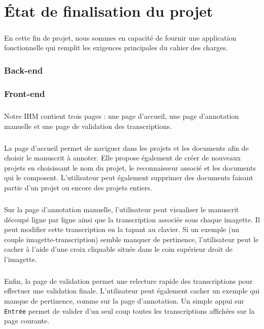 \chapter{État de finalisation du projet}

\paragraph{}
En cette fin de projet, nous sommes en capacité de fournir une application fonctionnelle qui remplit les exigences principales du cahier des charges.

\subsection{Back-end}

\subsection{Front-end}
\paragraph{}
Notre IHM contient trois pages : une page d'accueil, une page d'annotation manuelle et une page de validation des transcriptions.
\paragraph{}
La page d'accueil permet de naviguer dans les projets et les documents afin de choisir le manuscrit à annoter. Elle propose également de créer de nouveaux projets en choisissant le nom du projet, le reconnaisseur associé et les documents qui le composent. L'utilisateur peut également supprimer des documents faisant partie d'un projet ou encore des projets entiers.
\paragraph{}
Sur la page d'annotation manuelle, l'utilisateur peut visualiser le manuscrit découpé ligne par ligne ainsi que la transcription associée sous chaque imagette. Il peut modifier cette transcription en la tapant au clavier. Si un exemple (un couple imagette-transcription) semble manquer de pertinence, l'utilisateur peut le cacher à l'aide d'une croix cliquable située dans le coin supérieur droit de l'imagette.
\paragraph{}
Enfin, la page de validation permet une relecture rapide des transcriptions pour effectuer une validation finale. L'utilisateur peut également cacher un exemple qui manque de pertinence, comme sur la page d'annotation. Un simple appui sur \texttt{Entrée} permet de valider d'un seul coup toutes les transcriptions affichées sur la page courante.

